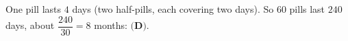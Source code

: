 One pill lasts $4$ days (two half-pills, each covering two days). So $60$ pills last $240$ days, about $\dfrac{240}{30}=8$ months: $\boxed{\textbf{(D)}}$.
